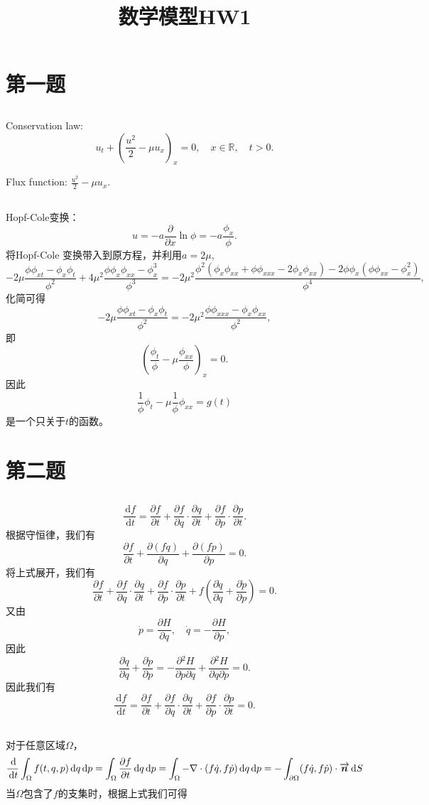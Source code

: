 \documentclass[a4paper,  11pt]{ctexart}
\newcommand\bbR{\mathbb{R}}
\newcommand\dd{\,\mathrm{d}}
\newcommand\pd[2]{\dfrac{\partial {#1}}{\partial {#2}}}
\newcommand\od[2]{\dfrac{\dd {#1}}{\dd {#2}}}
\newcommand{\bm}[1]{\mbox{\boldmath{$#1$}}}
\begin{document}
\title{数学模型HW1}
\maketitle
\section{第一题}
\subsection{}
Conservation law:
\[
     u_t + \left(\frac{u^2}{2}-\mu u_x\right)_x=0,\quad x\in\bbR,\quad
     t>0.
\]

Flux function: 
\(
    \frac{u^2}{2}-\mu u_x.
\)
\subsection{}
Hopf-Cole变换：
\[ 
u = -a\pd{}{x}\ln \phi = -a\frac{\phi_x}{\phi}.
\]
将Hopf-Cole 变换带入到原方程，并利用$a=2\mu$,
\[
-2\mu\frac{\phi\phi_{xt}-\phi_x\phi_t}{\phi^2}
+4\mu^2\frac{\phi\phi_x\phi_{xx}-\phi_x^3}{\phi^3}
=-2\mu^2\frac{\phi^2(\phi_x\phi_{xx}+\phi\phi_{xxx}-2\phi_x\phi_{xx})
-2\phi\phi_x(\phi\phi_{xx}-\phi_x^2)
}{\phi^4},
\]
化简可得
\[
-2\mu\frac{\phi\phi_{xt}-\phi_x\phi_t}{\phi^2}
=-2\mu^2\frac{\phi\phi_{xxx}-\phi_x\phi_{xx}
}{\phi^2},
\]
即
\[ 
  \left(
  \frac{\phi_t}{\phi}-\mu\frac{\phi_{xx}}{\phi}
  \right)_x=0.
\]
因此
\[ 
   \frac{1}{\phi}\phi_t-\mu\frac{1}{\phi}\phi_{xx}=g(t)
\]
是一个只关于$t$的函数。


\section{第二题}
\subsection{}
\[ 
   \od{f}{t} = \pd{f}{t} + \pd{f}{q}\cdot\pd{q}{t}+\pd{f}{p}\cdot 
   \pd{p}{t}.
\]
根据守恒律，我们有
\[ 
\pd{f}{t} + \pd{(f\dot{q})}{q} + \pd{(f\dot{p})}{p} = 0.
\]
将上式展开，我们有
\[ 
\pd{f}{t} + \pd{f}{q}\cdot\pd{q}{t} + \pd{f}{p}\cdot\pd{p}{t} 
+ f\left( \pd{\dot{q}}{q}+\pd{\dot{p}}{p}\right)= 0.
\]
又由
\[
    \dot{p} = \pd{H}{q},\quad \dot{q} = -\pd{H}{p},
\]
因此
\[  
    \pd{\dot{q}}{q} + \pd{\dot{p}}{p} = -\pd{^2H}{p\partial
    q}+\pd{^2H}{q\partial p}=0.
\]
因此我们有
\[ 
   \od{f}{t} = \pd{f}{t} + \pd{f}{q}\cdot\pd{q}{t}+\pd{f}{p}\cdot 
   \pd{p}{t} = 0.
\]
\subsection{}
对于任意区域$\Omega$，
\[
\od{}{t} \int_\Omega f(t,q,p)\dd q\dd p = 
\int_\Omega \pd{f}{t} \dd q\dd p = \int_\Omega
-\nabla\cdot(f\dot{q},f\dot{p})
\dd q\dd p = -\int_{\partial\Omega} (f\dot{q},f\dot{p})\cdot
\overrightarrow{\bm{n}}\dd S
\]
当$\Omega$包含了$f$的支集时，根据上式我们可得
\end{document}
